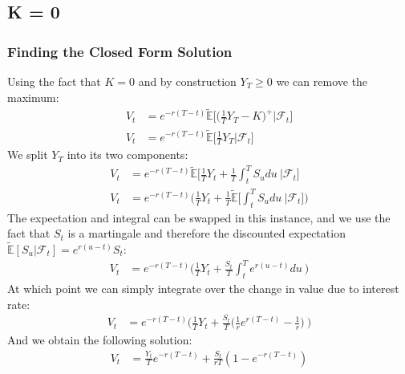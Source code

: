 \documentclass[a4paper,12pt]{article}
\begin{document}
\subsection{K = 0}
\subsubsection{Finding the Closed Form Solution}
Using the fact that $K = 0$ and by construction $Y_T \geq 0$ we can remove the maximum:
\begin{align*}
V_t &= e^{-r(T -  t)} \tilde{\mathbb{E}}\bigg[ \bigg(\frac{1}{T}Y_T - K \bigg)^+ | \mathcal{F}_t \bigg] \\
V_t &= e^{-r(T -  t)} \tilde{\mathbb{E}}\big[ \frac{1}{T}Y_T | \mathcal{F}_t \big]
\end{align*}
%
We split $Y_T$ into its two components:
\begin{align*}
V_t &= e^{-r(T -  t)} \tilde{\mathbb{E}}\bigg[ \frac{1}{T}Y_t + \frac{1}{T} \int_t^T S_u du \ | \mathcal{F}_t \big] \\
V_t &= e^{-r(T -  t)} \bigg( \frac{1}{T}Y_t + \frac{1}{T} \tilde{\mathbb{E}}\bigg[ \int_t^T S_u du \ | \mathcal{F}_t \big] \bigg)
\end{align*}
The expectation and integral can be swapped in this instance, and we use the fact that $S_t$ is a martingale and therefore the discounted expectation $\tilde{\mathbb{E}}[ S_u | \mathcal{F}_t] = e^{r(u - t)}S_t$:
\begin{align*}
V_t &= e^{-r(T -  t)} \bigg( \frac{1}{T}Y_t + \frac{S_t}{T} \int_t^T e^{r(u-t)} du \  \bigg)
\end{align*}
At which point we can simply integrate over the change in value due to interest rate:
\begin{align*}
V_t &= e^{-r(T -  t)} \bigg( \frac{1}{T}Y_t + \frac{S_t}{T}  \bigg(\frac{1}{r}e^{r(T-t)} - \frac{1}{r} \bigg) \  \bigg)
\end{align*}
And we obtain the following solution:
\begin{align}
V_t &= \frac{Y_t}{T}e^{-r(T -  t)} + \frac{S_t}{rT}(1 - e^{-r(T -  t)})
\end{align}
\end{document}
